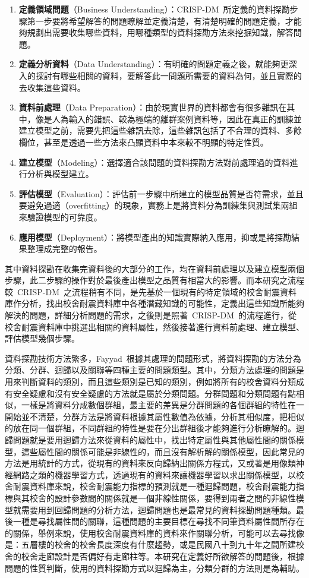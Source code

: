 \begin{enumerate}
\item \textbf{定義領域問題}（Business Understanding）：CRISP-DM~所定義的資料探勘步驟第一步要將希望解答的問題瞭解並定義清楚，有清楚明確的問題定義，才能夠規劃出需要收集哪些資料，用哪種類型的資料探勘方法來挖掘知識，解答問題。
\item \textbf{定義分析資料}（Data Understanding）：有明確的問題定義之後，就能夠更深入的探討有哪些相關的資料，要解答此一問題所需要的資料為何，並且實際的去收集這些資料。
\item \textbf{資料前處理}（Data Preparation）：由於現實世界的資料都會有很多雜訊在其中，像是人為輸入的錯誤、較為極端的離群案例資料等，因此在真正的訓練並建立模型之前，需要先把這些雜訊去除，這些雜訊包括了不合理的資料、多餘欄位，甚至是透過一些方法來凸顯資料中本來較不明顯的特定性質。
\item \textbf{建立模型}（Modeling）：選擇適合該問題的資料探勘方法對前處理過的資料進行分析與模型建立。
\item \textbf{評估模型}（Evaluation）：評估前一步驟中所建立的模型品質是否符需求，並且要避免過適（overfitting）的現象，實務上是將資料分為訓練集與測試集兩組來驗證模型的可靠度。
\item \textbf{應用模型}（Deployment）：將模型產出的知識實際納入應用，抑或是將探勘結果整理成完整的報告。
\end{enumerate}

其中資料探勘在收集完資料後的大部分的工作，均在資料前處理以及建立模型兩個步驟，此二步驟的操作對於最後產出模型之品質有相當大的影響。而本研究之流程較~CRISP-DM~之流程稍有不同，是先基於一個現有的特定領域的校舍耐震資料庫作分析，找出校舍耐震資料庫中各種潛藏知識的可能性，定義出這些知識所能夠解決的問題，詳細分析問題的需求，之後則是照著~CRISP-DM~的流程進行，從校舍耐震資料庫中挑選出相關的資料屬性，然後接著進行資料前處理、建立模型、評估模型幾個步驟。

資料探勘技術方法繁多，Fayyad~\cite{fayyad1996data}根據其處理的問題形式，將資料探勘的方法分為分類、分群、迴歸以及關聯等四種主要的問題類型。其中，分類方法處理的問題是用來判斷資料的類別，而且這些類別是已知的類別，例如將所有的校舍資料分類成有安全疑慮和沒有安全疑慮的方法就是屬於分類問題。分群問題和分類問題有點相似，一樣是將資料分成數個群組，最主要的差異是分群問題的各個群組的特性在一開始並不清楚，分群方法是將資料根據其屬性數值為依據，分析其相似度，把相似的放在同一個群組，不同群組的特性是要在分出群組後才能夠進行分析瞭解的。迴歸問題就是要用迴歸方法來從資料的屬性中，找出特定屬性與其他屬性間的關係模型，這些屬性間的關係可能是非線性的，而且沒有解析解的關係模型，因此常見的方法是用統計的方式，從現有的資料來反向歸納出關係方程式，又或著是用像類神經網路之類的機器學習方式，透過現有的資料來讓機器學習以求出關係模型，以校舍耐震資料庫來說，校舍耐震能力指標的預測就是一種迴歸問題，校舍耐震能力指標與其校舍的設計參數間的關係就是一個非線性關係，要得到兩者之間的非線性模型就需要用到回歸問題的分析方法，迴歸問題也是最常見的資料探勘問題種類。最後一種是尋找屬性間的關聯，這種問題的主要目標在尋找不同筆資料屬性間所存在的關係，舉例來說，使用校舍耐震資料庫的資料來作關聯分析，可能可以去尋找像是：五層樓的校舍的校舍長度深度有什麼趨勢，或是民國八十到九十年之間所建校舍的校舍走廊設計是否偏好有走廊柱等。本研究在定義好所欲解答的問題後，根據問題的性質判斷，使用的資料探勘方式以迴歸為主，分類分群的方法則是為輔助。

